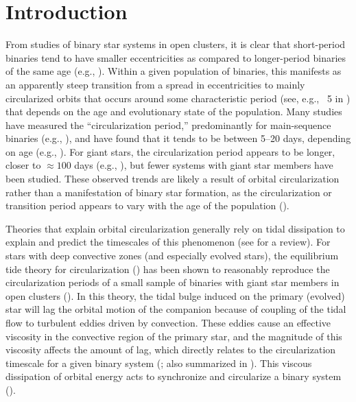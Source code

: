 \documentclass[modern, letterpaper]{aastex62}
\begin{document}

\section{Introduction} \label{sec:intro}

From studies of binary star systems in open clusters, it is clear that
short-period binaries tend to have smaller eccentricities as compared to
longer-period binaries of the same age (e.g., \citealt{Mathieu:2005}).
Within a given population of binaries, this manifests as an apparently steep
transition from a spread in eccentricities to mainly circularized orbits
that occurs around some characteristic period (see, e.g., \figurename~5 in
\citealt{Mathieu:2005}) that depends on the age and evolutionary state of the
population.
Many studies have measured the ``circularization period,'' predominantly for
main-sequence binaries (e.g., \citealt{Latham:2002, Meibom:2006,
Kjurkchieva:2017}), and have found that it tends to be between 5--20 days,
depending on age (e.g., \citealt{Mathieu:1988}).
For giant stars, the circularization period appears to be longer, closer to
$\approx 100$ days (e.g., \citealt{Mayor:1984, Bluhm:2016}), but fewer systems
with giant star members have been studied.
These observed trends are likely a result of orbital circularization rather than
a manifestation of binary star formation, as the circularization or transition
period appears to vary with the age of the population (\citealt{Meibom:2005}).

Theories that explain orbital circularization generally rely on tidal
dissipation to explain and predict the timescales of this phenomenon (see
\citealt{Mazeh:2007hp} for a review).
For stars with deep convective zones (and especially evolved stars), the
equilibrium tide theory for circularization (\citealt{Zahn:1977, Zahn:1989}) has
been shown to reasonably reproduce the circularization periods of a small sample
of binaries with giant star members in open clusters (\citealt{Verbunt:1995}).
In this theory, the tidal bulge induced on the primary (evolved) star will lag
the orbital motion of the companion because of coupling of the tidal flow to
turbulent eddies driven by convection.
These eddies cause an effective viscosity in the convective region of the
primary star, and the magnitude of this viscosity affects the amount of lag,
which directly relates to the circularization timescale for a given binary
system (\citealt{Zahn:1989}; also summarized in \citealt{Goodman:1997}).
This viscous dissipation of orbital energy acts to synchronize and circularize a
binary system (\citealt{Zahn:1977, Zahn:1989}).
\end{document}
